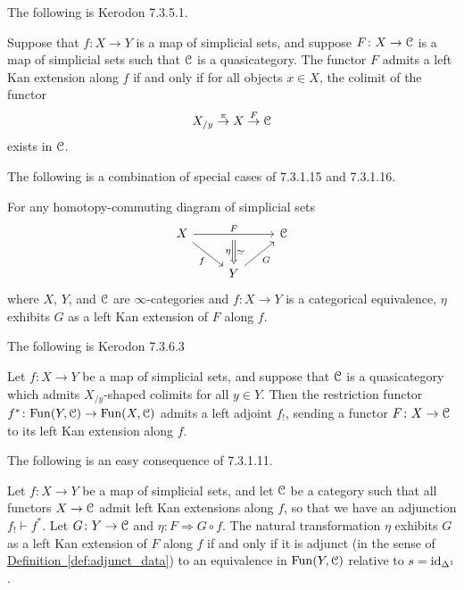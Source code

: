 \documentclass[main.tex]{subfiles}
\begin{document}
The following is Kerodon 7.3.5.1.
\begin{theorem}
  \label{thm:existence_local_left_kan_exts}
  Suppose that $f\colon X \to Y$ is a map of simplicial sets, and suppose $F\colon X \to \mathcal{C}$ is a map of simplicial sets such that $\mathcal{C}$ is a quasicategory. The functor $F$ admits a left Kan extension along $f$ if and only if for all objects $x \in X$, the colimit of the functor
  \begin{equation*}
    X_{/y} \overset{\pi}{\to} X \overset{F}{\to} \mathcal{C}
  \end{equation*}
  exists in $\mathcal{C}$.
\end{theorem}

The following is a combination of special cases of 7.3.1.15 and 7.3.1.16.
\begin{example}
  \label{eg:strictly_commuting_left_kan}
  For any homotopy-commuting diagram of simplicial sets
  \begin{equation*}
    \begin{tikzcd}
      X
      \arrow[dr, swap, "f"]
      \arrow[rr, "F", ""{below, name=M}]
      && \category{C}
      \\
      & Y
      \arrow[ur, swap, "G"]
      \arrow[from=M, Rightarrow, "\simeq", "\eta"{swap}]
    \end{tikzcd}
  \end{equation*}
  where $X$, $Y$, and $\mathcal{C}$ are $\infty$-categories and $f\colon X \to Y$ is a categorical equivalence, $\eta$ exhibits $G$ as a left Kan extension of $F$ along $f$.
\end{example}

The following is Kerodon 7.3.6.3
\begin{theorem}
  \label{thm:existence_global_left_kan_exts}
  Let $f\colon X \to Y$ be a map of simplicial sets, and suppose that $\mathcal{C}$ is a quasicategory which admits $X_{/y}$-shaped colimits for all $y \in Y$. Then the restriction functor $f^{*}\colon \mathrm{Fun}(Y, \mathcal{C}) \to \mathrm{Fun}(X, \mathcal{C})$ admits a left adjoint $f_{!}$, sending a functor $F\colon X \to \mathcal{C}$ to its left Kan extension along $f$.
\end{theorem}

The following is an easy consequence of 7.3.1.11.
\begin{proposition}
  Let $f\colon X \to Y$ be a map of simplicial sets, and let $\mathcal{C}$ be a category such that all functors $X \to \mathcal{C}$ admit left Kan extensions along $f$, so that we have an adjunction $f_{!} \vdash f^{*}$. Let $G\colon Y \to \mathcal{C}$ and $\eta\colon F \Rightarrow G \circ f$. The natural transformation $\eta$ exhibits $G$ as a left Kan extension of $F$ along $f$ if and only if it is adjunct (in the sense of \hyperref[def:adjunct_data]{Definition~\ref*{def:adjunct_data}}) to an equivalence in $\mathrm{Fun}(Y, \mathcal{C})$ relative to $s = \mathrm{id}_{\Delta^{1}}$.
\end{proposition}
\end{document}
